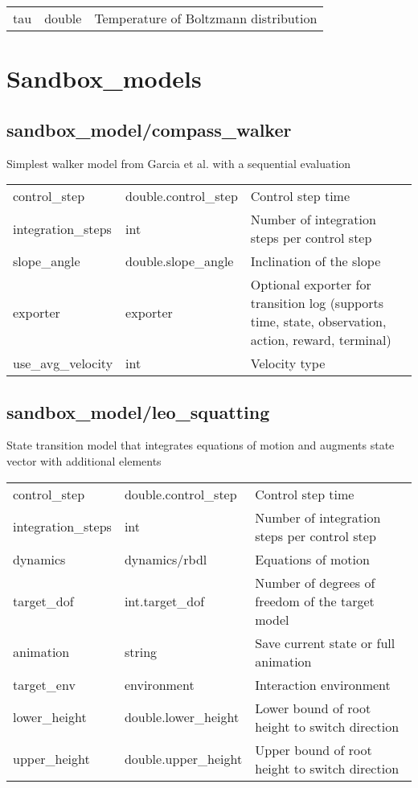 \noindent\begin{tabular}{@{}lll@{}}
tau&double&Temperature of Boltzmann distribution\\
\end{tabular}
\section{Sandbox\_models}
\subsection{sandbox\_model/compass\_walker}
\noindent Simplest walker model from Garcia et al. with a sequential evaluation\\

\noindent\begin{tabular}{@{}lll@{}}
control\_step&double.control\_step&Control step time\\
integration\_steps&int&Number of integration steps per control step\\
slope\_angle&double.slope\_angle&Inclination of the slope\\
exporter&exporter&Optional exporter for transition log (supports time, state, observation, action, reward, terminal)\\
use\_avg\_velocity&int&Velocity type \\
\end{tabular}
\subsection{sandbox\_model/leo\_squatting}
\noindent State transition model that integrates equations of motion and augments state vector with additional elements\\

\noindent\begin{tabular}{@{}lll@{}}
control\_step&double.control\_step&Control step time\\
integration\_steps&int&Number of integration steps per control step\\
dynamics&dynamics/rbdl&Equations of motion\\
target\_dof&int.target\_dof&Number of degrees of freedom of the target model\\
animation&string&Save current state or full animation\\
target\_env&environment&Interaction environment\\
lower\_height&double.lower\_height&Lower bound of root height to switch direction\\
upper\_height&double.upper\_height&Upper bound of root height to switch direction\\
\end{tabular}
